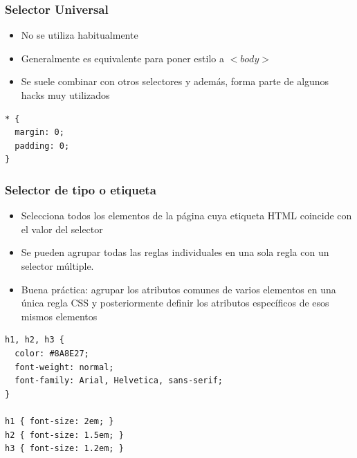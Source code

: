 \documentclass[ucs]{beamer}
\begin{document}

\begin{frame}[fragile]
\frametitle{Selector Universal}

\begin{itemize}
  \item No se utiliza habitualmente
  \item Generalmente es equivalente para poner estilo a $<body>$
  \item Se suele combinar con otros selectores y además, forma parte de algunos hacks muy utilizados
\end{itemize}

\begin{verbatim}
* {
  margin: 0;
  padding: 0;
}
\end{verbatim}

\end{frame}


\begin{frame}[fragile]
\frametitle{Selector de tipo o etiqueta}

\begin{itemize}
  \item Selecciona todos los elementos de la página cuya etiqueta HTML coincide con el valor del selector
  \item Se pueden agrupar todas las reglas individuales en una sola regla con un selector múltiple.
  \item Buena práctica: agrupar los atributos comunes de varios elementos en una única regla CSS y posteriormente definir los atributos específicos de esos mismos elementos
\end{itemize}

{\footnotesize
\begin{verbatim}
h1, h2, h3 {
  color: #8A8E27;
  font-weight: normal;
  font-family: Arial, Helvetica, sans-serif;
}
 
h1 { font-size: 2em; }
h2 { font-size: 1.5em; }
h3 { font-size: 1.2em; }
\end{verbatim}
}

\end{frame}

\end{document}
